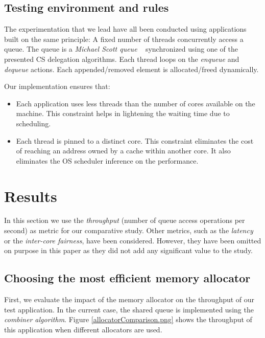 \documentclass[10pt]{article}											%
\begin{document}

\subsection{Testing environment and rules}

The experimentation that we lead have all been conducted using applications built on the same principle:  A fixed number of threads concurrently access a queue.   The queue is a \emph{Michael Scott queue} ~\cite{queue_michaelScott} synchronized using one of the presented CS delegation algorithms.   Each thread loops on the \textit{enqueue} and \textit{dequeue} actions.   Each appended/removed element is allocated/freed dynamically. 

Our implementation ensures that:
\begin{itemize}
	\item Each application uses less threads than the number of cores available on the machine.   This constraint helps in lightening the waiting time due to scheduling.
	\item Each thread is pinned to a distinct core.   This constraint eliminates the cost of reaching an address owned by a cache within another core.   It also eliminates the OS scheduler inference on the performance.
\end{itemize}







\section{Results}\label{results}
In this section we use the \textit{throughput} (number of queue access operations per second) as metric for our comparative study.   Other metrics, such as the \textit{latency} or the \textit{inter-core fairness}, have been considered.   However, they have been omitted on purpose in this paper as they did not add any significant value to the study.\\



\subsection{Choosing the most efficient memory allocator}\label{allocatorComparison}
First, we evaluate the impact of the memory allocator on the throughput of our test application. In the current case, the shared queue is implemented using the \emph{combiner algorithm}.   Figure \ref{allocatorComparison.png} shows the throughput of this application when different allocators are used.
\end{document}
